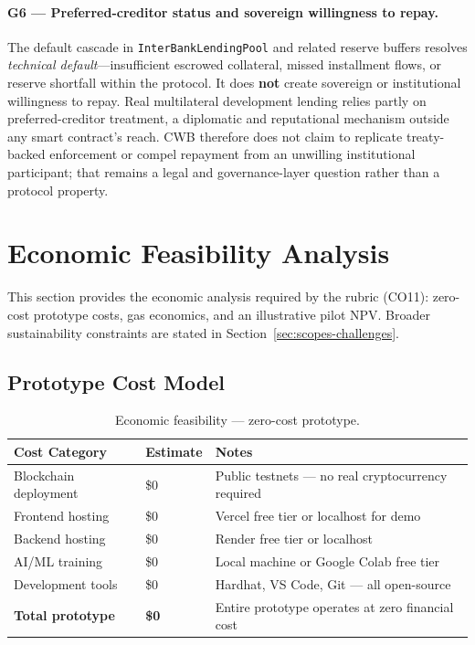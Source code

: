 \documentclass[12pt,a4paper]{report}
\newcommand{\tableheadcolor}{\rowcolor{TableHeadBg}}
\begin{document}
\paragraph{G6 --- Preferred-creditor status and sovereign willingness to repay.}
The default cascade in \texttt{InterBankLendingPool} and related reserve buffers resolves \textit{technical default}---insufficient escrowed collateral, missed installment flows, or reserve shortfall within the protocol. It does \textbf{not} create sovereign or institutional willingness to repay. Real multilateral development lending relies partly on preferred-creditor treatment, a diplomatic and reputational mechanism outside any smart contract's reach. CWB therefore does not claim to replicate treaty-backed enforcement or compel repayment from an unwilling institutional participant; that remains a legal and governance-layer question rather than a protocol property.

\section{Economic Feasibility Analysis}
\label{sec:economic-feasibility-chapter}

This section provides the economic analysis required by the rubric (CO11): zero-cost prototype costs, gas economics, and an illustrative pilot NPV. Broader sustainability constraints are stated in Section~\ref{sec:scopes-challenges}.

\subsection{Prototype Cost Model}
\label{sec:economic-feasibility}

\begin{table}[H]
\centering
\caption[Economic feasibility --- zero-cost prototype]{Economic feasibility --- zero-cost prototype.}
\label{tab:economic-feasibility}
\begin{tabular}{p{4cm}p{2.5cm}p{7cm}}
\toprule
\tableheadcolor
\textbf{Cost Category} & \textbf{Estimate} & \textbf{Notes} \\
\midrule
Blockchain deployment & \$0 & Public testnets --- no real cryptocurrency required \\
Frontend hosting & \$0 & Vercel free tier or localhost for demo \\
Backend hosting & \$0 & Render free tier or localhost \\
AI/ML training & \$0 & Local machine or Google Colab free tier \\
Development tools & \$0 & Hardhat, VS Code, Git --- all open-source \\
\textbf{Total prototype} & \textbf{\$0} & Entire prototype operates at zero financial cost \\
\bottomrule
\end{tabular}
\end{table}
\end{document}
